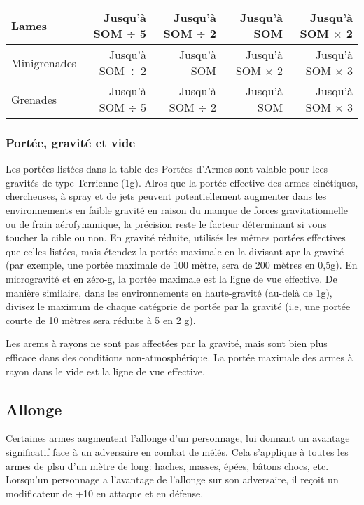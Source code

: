 \begin{table}
\begin{tabularx}{\textwidth}{|X|r|r|r|r|}
Lames &Jusqu'à SOM $\div$ 5 &Jusqu'à SOM $\div$ 2 &Jusqu'à SOM &Jusqu'à SOM $\times$ 2 \\ \hline

Minigrenades &Jusqu'à SOM $\div$ 2 &Jusqu'à SOM &Jusqu'à SOM $\times$ 2 &Jusqu'à SOM $\times$ 3 \\ \hline

Grenades &Jusqu'à SOM $\div$ 5 &Jusqu'à SOM $\div$ 2 &Jusqu'à SOM &Jusqu'à SOM $\times$ 3 \\ \hline

\end{tabularx} \end{table} 



\subsubsection{Portée, gravité et vide} 

Les portées listées dans la table des Portées d'Armes sont valable pour lees gravités de type Terrienne (1g). Alros que la portée effective des armes cinétiques, chercheuses, à spray et de jets peuvent potentiellement augmenter dans les environnements en faible gravité en raison du manque de forces gravitationnelle ou de frain aérofynamique, la précision reste le facteur déterminant si vous toucher la cible ou non. En gravité réduite, utilisés les mêmes portées effectives que celles listées, mais étendez la portée maximale en la divisant apr la gravité (par exemple, une portée maximale de 100 mètre, sera de 200 mètres en 0,5g). En microgravité et en zéro-g, la portée maximale est la ligne de vue effective. De manière similaire, dans les environnements en haute-gravité (au-delà de 1g), divisez le maximum de chaque catégorie de portée  par la gravité (i.e, une portée courte de 10 mètres sera réduite à 5 en 2 g). 

Les arems à rayons ne sont pas affectées par la gravité, mais sont bien plus efficace dans des conditions non-atmosphérique. La portée maximale des armes à rayon dans le vide est la ligne de vue effective. 



\subsection{Allonge} \label{sec:reach} 

Certaines armes augmentent l'allonge d'un personnage, lui donnant un avantage significatif face à un adversaire en combat de mélés. Cela s'applique à toutes les armes de plsu d'un mètre de long: haches, masses, épées, bâtons chocs, etc. Lorsqu'un personnage a l'avantage de l'allonge sur son adversaire, il reçoit un modificateur de +10 en attaque et en défense. 



